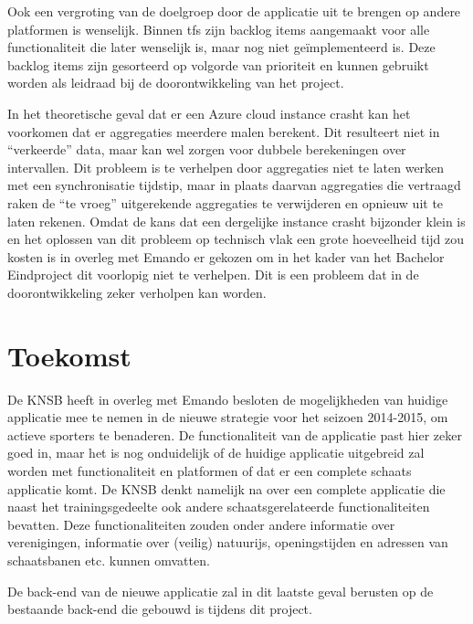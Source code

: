 Ook een vergroting van de doelgroep door de applicatie uit te brengen op andere platformen is wenselijk. Binnen \ac{tfs} zijn backlog items aangemaakt voor alle functionaliteit die later wenselijk is, maar nog niet geïmplementeerd is. Deze backlog items zijn gesorteerd op volgorde van prioriteit en kunnen gebruikt worden als leidraad bij de doorontwikkeling van het project.

In het theoretische geval dat er een Azure cloud instance crasht kan het voorkomen dat er aggregaties meerdere malen berekent. Dit resulteert niet in ``verkeerde'' data, maar kan wel zorgen voor dubbele berekeningen over intervallen. Dit probleem is te verhelpen door aggregaties niet te laten werken met een synchronisatie tijdstip, maar in plaats daarvan aggregaties die vertraagd raken de ``te vroeg'' uitgerekende aggregaties te verwijderen en opnieuw uit te laten rekenen. Omdat de kans dat een dergelijke instance crasht bijzonder klein is en het oplossen van dit probleem op technisch vlak een grote hoeveelheid tijd zou kosten is in overleg met Emando er gekozen om in het kader van het Bachelor Eindproject dit voorlopig niet te verhelpen. Dit is een probleem dat in de doorontwikkeling zeker verholpen kan worden.

\section{Toekomst}
De \ac{KNSB} heeft in overleg met Emando besloten de mogelijkheden van huidige applicatie mee te nemen in de nieuwe strategie voor het seizoen 2014-2015, om actieve sporters te benaderen. De functionaliteit van de applicatie past hier zeker goed in, maar het is nog onduidelijk of de huidige applicatie uitgebreid zal worden met functionaliteit en platformen of dat er een complete schaats applicatie komt. De \ac{KNSB} denkt namelijk na over een complete applicatie die naast het trainingsgedeelte ook andere schaatsgerelateerde functionaliteiten bevatten. Deze functionaliteiten zouden onder andere informatie over verenigingen, informatie over (veilig) natuurijs, openingstijden en adressen van schaatsbanen etc. kunnen omvatten.

De back-end van de nieuwe applicatie zal in dit laatste geval berusten op de bestaande back-end die gebouwd is tijdens dit project.